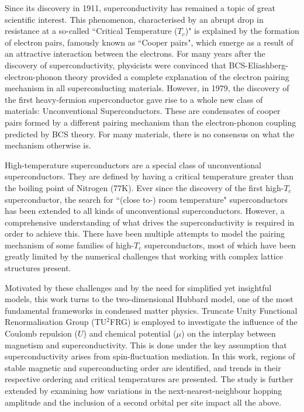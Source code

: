 \documentclass[11pt]{article}
\begin{document}
Since its discovery in 1911\cite{onnes1911superconductivity}, superconductivity has remained a topic of great scientific interest.
This phenomenon, characterised by an abrupt drop in resistance at a so-called ``Critical Temperature ($T_c$)"\cite{geballe2015tc}
is explained by the formation of electron pairs, famously known as ``Cooper pairs"\cite{schrieffer2018theory}, which emerge as a result of an attractive interaction between the electrons. For many 
years after the discovery of superconductivity, physicists
were convinced that BCS-Eliashberg-electron-phonon theory \cite{schrieffer2018theory} provided a complete explanation of the electron pairing mechanism in all superconducting materials. 
However, in 1979, the discovery of the first heavy-fermion superconductor\cite{steglich1979superconductivity} gave rise to a whole new class of materials: Unconventional Superconductors. 
These are condensates of cooper pairs formed by a different pairing mechanism than the electron-phonon coupling predicted by BCS theory\cite{hirsch2015superconducting}.
For many materials, there is no consensus on what the mechanism otherwise is\cite{norman2011challenge}.\par

\medskip
\noindent High-temperature superconductors are a special class of unconventional superconductors. They are defined by having a critical temperature greater than the boiling point 
of Nitrogen (77K). Ever since the discovery of the first high-$T_c$ superconductor\cite{bednorz1986possible}, the search for ``(close to-) room temperature" superconductors has been extended to 
all kinds of unconventional superconductors. However, a comprehensive understanding of what drives the superconductivity is required in order 
to achieve this. There have been multiple attempts to model the pairing mechanism of some families of high-$T_c$ superconductors, most of which have
been greatly limited by the numerical challenges that working with complex lattice structures present.\par 

\medskip
\noindent Motivated by these challenges and by the need for simplified yet insightful models, this work turns to the two-dimensional Hubbard model, one of the most fundamental frameworks in condensed matter physics. Truncate Unity Functional Renormalisation Group (TU$^2$FRG)\cite{eckhardt2020truncated} is employed to 
investigate the influence of the Coulomb repulsion ($U$) and chemical potential ($\mu$) on the interplay between magnetism and superconductivity.
This is done under the key assumption that superconductivity arises from spin-fluctuation mediation.
In this work, regions of stable magnetic and superconducting order are identified, and trends in their respective ordering and critical temperatures are presented.
The study is further extended by examining how variations in the next-nearest-neighbour hopping amplitude and the inclusion of a second orbital per site impact all the above.
\end{document}
